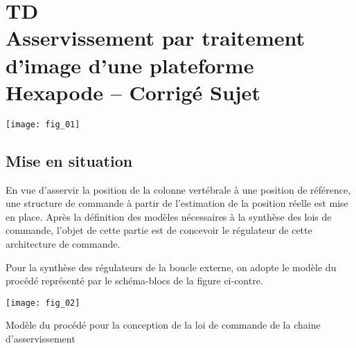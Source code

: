 \chapter*{TD  \\ 
Asservissement par traitement d’image d’une plateforme Hexapode -- 
\ifprof Corrigé \else Sujet \fi}

\iflivret {} \else
\ifprof  {} \else \fi
\fi

\setcounter{question}{0}

\begin{marginfigure} [4cm]
\centering
\texttt{[image: fig\_01]}
\end{marginfigure}


\section*{Mise en situation}
\begin{obj}
En vue d’asservir la position de la colonne vertébrale à une position de référence, une structure de
commande à partir de l’estimation de la position réelle est mise en place. Après la définition des
modèles nécessaires à la synthèse des lois de commande, l’objet de cette partie est de concevoir le
régulateur de cette architecture de commande.

\end{obj}


Pour la synthèse des régulateurs de la boucle externe, on adopte le modèle du procédé représenté par le schéma-blocs de la figure ci-contre. 

\begin{marginfigure}[3cm]
\texttt{[image: fig\_02]}
\caption{Modèle du procédé pour la conception de la loi de commande
de la chaine d’asservissement}
\end{marginfigure}

